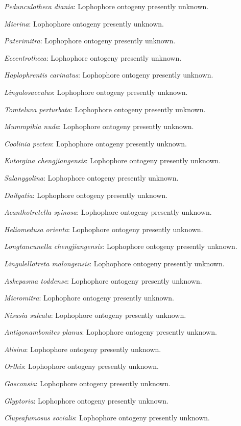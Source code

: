 \documentclass[]{book}
\theoremstyle{definition}
\theoremstyle{definition}
\theoremstyle{definition}
\theoremstyle{remark}
\begin{document}
\emph{Pedunculotheca diania}: Lophophore ontogeny presently unknown.

\emph{Micrina}: Lophophore ontogeny presently unknown.

\emph{Paterimitra}: Lophophore ontogeny presently unknown.

\emph{Eccentrotheca}: Lophophore ontogeny presently unknown.

\emph{Haplophrentis carinatus}: Lophophore ontogeny presently unknown.

\emph{Lingulosacculus}: Lophophore ontogeny presently unknown.

\emph{Tomteluva perturbata}: Lophophore ontogeny presently unknown.

\emph{Mummpikia nuda}: Lophophore ontogeny presently unknown.

\emph{Coolinia pecten}: Lophophore ontogeny presently unknown.

\emph{Kutorgina chengjiangensis}: Lophophore ontogeny presently unknown.

\emph{Salanygolina}: Lophophore ontogeny presently unknown.

\emph{Dailyatia}: Lophophore ontogeny presently unknown.

\emph{Acanthotretella spinosa}: Lophophore ontogeny presently unknown.

\emph{Heliomedusa orienta}: Lophophore ontogeny presently unknown.

\emph{Longtancunella chengjiangensis}: Lophophore ontogeny presently
unknown.

\emph{Lingulellotreta malongensis}: Lophophore ontogeny presently
unknown.

\emph{Askepasma toddense}: Lophophore ontogeny presently unknown.

\emph{Micromitra}: Lophophore ontogeny presently unknown.

\emph{Nisusia sulcata}: Lophophore ontogeny presently unknown.

\emph{Antigonambonites planus}: Lophophore ontogeny presently unknown.

\emph{Alisina}: Lophophore ontogeny presently unknown.

\emph{Orthis}: Lophophore ontogeny presently unknown.

\emph{Gasconsia}: Lophophore ontogeny presently unknown.

\emph{Glyptoria}: Lophophore ontogeny presently unknown.

\emph{Clupeafumosus socialis}: Lophophore ontogeny presently unknown.
\end{document}
